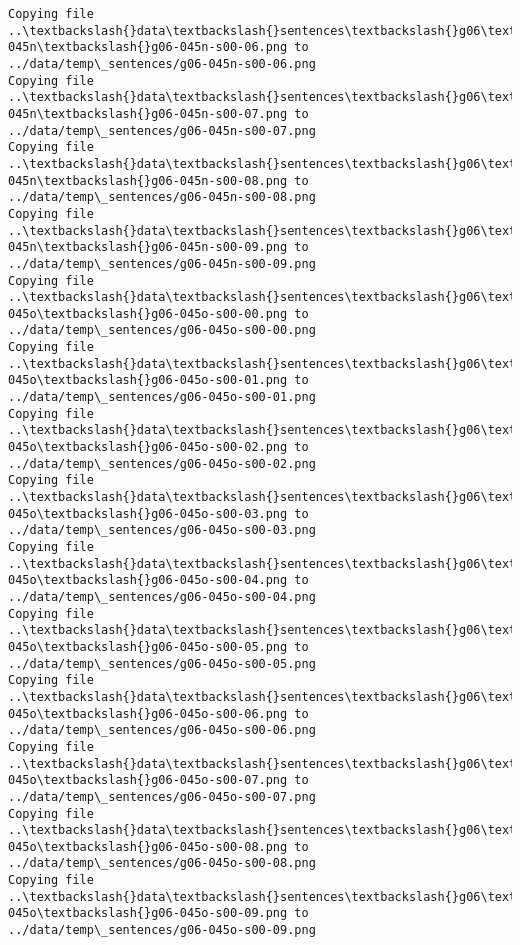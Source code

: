 \documentclass[11pt]{article}
\begin{document}
\begin{Verbatim}[commandchars=\\\{\}]
Copying file ..\textbackslash{}data\textbackslash{}sentences\textbackslash{}g06\textbackslash{}g06-045n\textbackslash{}g06-045n-s00-06.png to
../data/temp\_sentences/g06-045n-s00-06.png
Copying file ..\textbackslash{}data\textbackslash{}sentences\textbackslash{}g06\textbackslash{}g06-045n\textbackslash{}g06-045n-s00-07.png to
../data/temp\_sentences/g06-045n-s00-07.png
Copying file ..\textbackslash{}data\textbackslash{}sentences\textbackslash{}g06\textbackslash{}g06-045n\textbackslash{}g06-045n-s00-08.png to
../data/temp\_sentences/g06-045n-s00-08.png
Copying file ..\textbackslash{}data\textbackslash{}sentences\textbackslash{}g06\textbackslash{}g06-045n\textbackslash{}g06-045n-s00-09.png to
../data/temp\_sentences/g06-045n-s00-09.png
Copying file ..\textbackslash{}data\textbackslash{}sentences\textbackslash{}g06\textbackslash{}g06-045o\textbackslash{}g06-045o-s00-00.png to
../data/temp\_sentences/g06-045o-s00-00.png
Copying file ..\textbackslash{}data\textbackslash{}sentences\textbackslash{}g06\textbackslash{}g06-045o\textbackslash{}g06-045o-s00-01.png to
../data/temp\_sentences/g06-045o-s00-01.png
Copying file ..\textbackslash{}data\textbackslash{}sentences\textbackslash{}g06\textbackslash{}g06-045o\textbackslash{}g06-045o-s00-02.png to
../data/temp\_sentences/g06-045o-s00-02.png
Copying file ..\textbackslash{}data\textbackslash{}sentences\textbackslash{}g06\textbackslash{}g06-045o\textbackslash{}g06-045o-s00-03.png to
../data/temp\_sentences/g06-045o-s00-03.png
Copying file ..\textbackslash{}data\textbackslash{}sentences\textbackslash{}g06\textbackslash{}g06-045o\textbackslash{}g06-045o-s00-04.png to
../data/temp\_sentences/g06-045o-s00-04.png
Copying file ..\textbackslash{}data\textbackslash{}sentences\textbackslash{}g06\textbackslash{}g06-045o\textbackslash{}g06-045o-s00-05.png to
../data/temp\_sentences/g06-045o-s00-05.png
Copying file ..\textbackslash{}data\textbackslash{}sentences\textbackslash{}g06\textbackslash{}g06-045o\textbackslash{}g06-045o-s00-06.png to
../data/temp\_sentences/g06-045o-s00-06.png
Copying file ..\textbackslash{}data\textbackslash{}sentences\textbackslash{}g06\textbackslash{}g06-045o\textbackslash{}g06-045o-s00-07.png to
../data/temp\_sentences/g06-045o-s00-07.png
Copying file ..\textbackslash{}data\textbackslash{}sentences\textbackslash{}g06\textbackslash{}g06-045o\textbackslash{}g06-045o-s00-08.png to
../data/temp\_sentences/g06-045o-s00-08.png
Copying file ..\textbackslash{}data\textbackslash{}sentences\textbackslash{}g06\textbackslash{}g06-045o\textbackslash{}g06-045o-s00-09.png to
../data/temp\_sentences/g06-045o-s00-09.png

\end{Verbatim}
\end{document}
